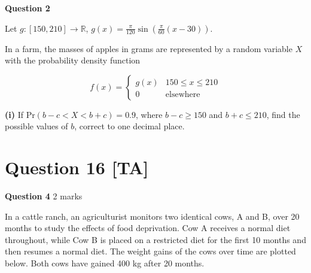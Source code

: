 \documentclass[10pt,a4paper]{article}
\begin{document}
\textbf{Question 2}

Let $g : [150,210] \to \mathbb{R}$, $g(x) = \frac{\pi}{120}\sin\left(\frac{\pi}{60}(x - 30)\right)$.

In a farm, the masses of apples in grams are represented by a random variable $X$ with the probability density function

\[
f(x) = \begin{cases}
g(x) & 150 \leq x \leq 210\\
0 & \text{elsewhere}
\end{cases}
\]

\textbf{(i)} If $\text{Pr}(b - c < X < b + c) = 0.9$, where $b - c \geq 150$ and $b + c \leq 210$, find the possible values of $b$, correct to one decimal place.

\vspace{9\baselineskip}

\hrulefill

\section*{Question 16 [TA]}

\textbf{Question 4} \hfill 2 marks

In a cattle ranch, an agriculturist monitors two identical cows, A and B, over 20 months to study the effects of food deprivation. Cow A receives a normal diet throughout, while Cow B is placed on a restricted diet for the first 10 months and then resumes a normal diet. The weight gains of the cows over time are plotted below. Both cows have gained 400 kg after 20 months.
\end{document}

